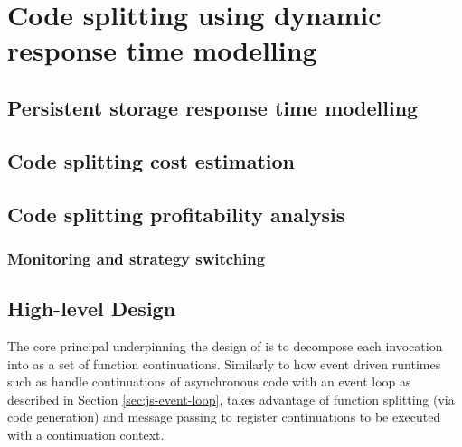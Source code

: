 \chapter{Code splitting using dynamic response time modelling}

\section{Persistent storage response time modelling}

\section{Code splitting cost estimation}

\section{Code splitting profitability analysis}

\subsection{Monitoring and strategy switching}

\section{High-level Design}
The core principal underpinning the design of \faaas{} is to decompose each \faas{} invocation into as a set of function continuations. Similarly to how event driven runtimes such as \js{} handle continuations of asynchronous code with an event loop as described in Section \ref{sec:js-event-loop}, \faaas{} takes advantage of function splitting (via code generation) and message passing to register continuations to be executed with a continuation context.

